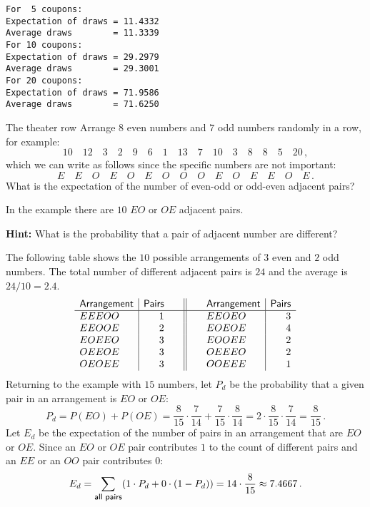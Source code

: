 \sml{}
\begin{verbatim}
For  5 coupons:
Expectation of draws = 11.4332
Average draws        = 11.3339
For 10 coupons:
Expectation of draws = 29.2979
Average draws        = 29.3001
For 20 coupons:
Expectation of draws = 71.9586
Average draws        = 71.6250
\end{verbatim}


\begin{prob}{The theater row}
Arrange $8$ even numbers and $7$ odd numbers randomly in a row, for example:
\[
10\quad 12\quad 3\quad 2\quad 9\quad 6 \quad 1\quad 13\quad 7\quad 10\quad 3\quad 8\quad 8\quad 5\quad 20\,,
\]
which we can write as follows since the specific numbers are not important:
\[
E\quad E\quad O\quad E\quad O\quad E \quad O\quad O\quad O\quad E\quad O\quad E\quad E\quad O\quad E\,.
\]
What is the expectation of the number of even-odd or odd-even adjacent pairs?

In the example there are $10$ $EO$ or $OE$ adjacent pairs.

\textbf{Hint:} What is the probability that a pair of adjacent number are different?
\end{prob}

\newpage

\solution{}

The following table shows the $10$ possible arrangements of $3$ even and $2$ odd numbers. The total number of different adjacent pairs is $24$ and the average is $24/10=2.4$.
\[
\begin{array}{l|r@{\hspace{2em}}|@{\hspace{2pt}}|@{\hspace{2em}}l|r}
\textsf{Arrangement}&\textsf{Pairs}&\textsf{Arrangement}&\textsf{Pairs}\\\hline
EEEOO & 1&
EEOEO & 3\\
EEOOE & 2&
EOEOE & 4\\
EOEEO & 3&
EOOEE & 2\\
OEEOE & 3&
OEEEO & 2\\
OEOEE & 3&
OOEEE & 1\\
\end{array}
\]
Returning to the example with $15$ numbers, let $P_d$ be the probability that a given pair in an arrangement is $EO$ or $OE$:
\[
P_d =P(EO) + P(OE) = \frac{8}{15}\cdot \frac{7}{14} + \frac{7}{15}\cdot \frac{8}{14} = 2\cdot \frac{8}{15}\cdot \frac{7}{14} = \frac{8}{15}\,.
\]
Let $E_d$ be the expectation of the number of pairs in an arrangement that are $EO$ or $OE$. Since an $EO$ or $OE$ pair contributes $1$ to the count of different pairs and an $EE$ or an $OO$ pair contributes $0$:
\[
E_d =
\sum_{\textsf{\footnotesize all pairs}} (1\cdot P_d + 0\cdot (1-P_d))= 14\cdot \frac{8}{15} \approx 7.4667\,.
\]

